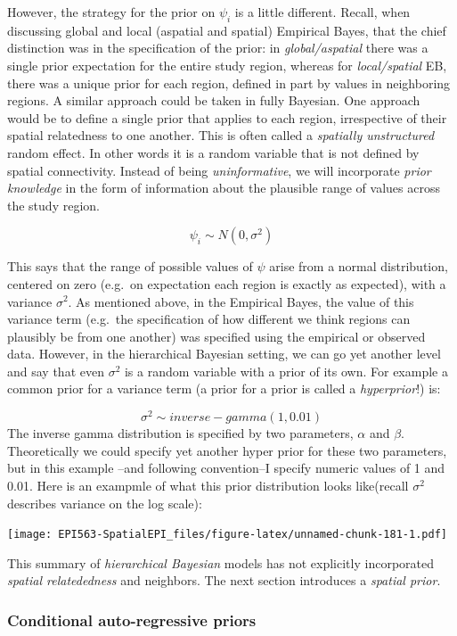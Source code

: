 \documentclass[
]{book}
\begin{document}
However, the strategy for the prior on \(\psi_i\) is a little different. Recall, when discussing global and local (aspatial and spatial) Empirical Bayes, that the chief distinction was in the specification of the prior: in \emph{global/aspatial} there was a single prior expectation for the entire study region, whereas for \emph{local/spatial} EB, there was a unique prior for each region, defined in part by values in neighboring regions. A similar approach could be taken in fully Bayesian. One approach would be to define a single prior that applies to each region, irrespective of their spatial relatedness to one another. This is often called a \emph{spatially unstructured} random effect. In other words it is a random variable that is not defined by spatial connectivity. Instead of being \emph{uninformative}, we will incorporate \emph{prior knowledge} in the form of information about the plausible range of values across the study region.

\[\psi_i \sim N(0,\sigma^2)\]

This says that the range of possible values of \(\psi\) arise from a normal distribution, centered on zero (e.g.~on expectation each region is exactly as expected), with a variance \(\sigma^2\). As mentioned above, in the Empirical Bayes, the value of this variance term (e.g.~the specification of how different we think regions can plausibly be from one another) was specified using the empirical or observed data. However, in the hierarchical Bayesian setting, we can go yet another level and say that even \(\sigma^2\) is a random variable with a prior of its own. For example a common prior for a variance term (a prior for a prior is called a \emph{hyperprior}!) is:

\[\sigma^2 \sim inverse-gamma(1, 0.01)\]
The inverse gamma distribution is specified by two parameters, \(\alpha\) and \(\beta\). Theoretically we could specify yet another hyper prior for these two parameters, but in this example --and following convention--I specify numeric values of 1 and 0.01. Here is an exampmle of what this prior distribution looks like(recall \(\sigma^2\) describes variance on the log scale):

\texttt{[image: EPI563-SpatialEPI\_files/figure-latex/unnamed-chunk-181-1.pdf]}

This summary of \emph{hierarchical Bayesian} models has not explicitly incorporated \emph{spatial relatededness} and neighbors. The next section introduces a \emph{spatial prior}.

\hypertarget{conditional-auto-regressive-priors}{%
\subsubsection{Conditional auto-regressive priors}\label{conditional-auto-regressive-priors}}
\end{document}
